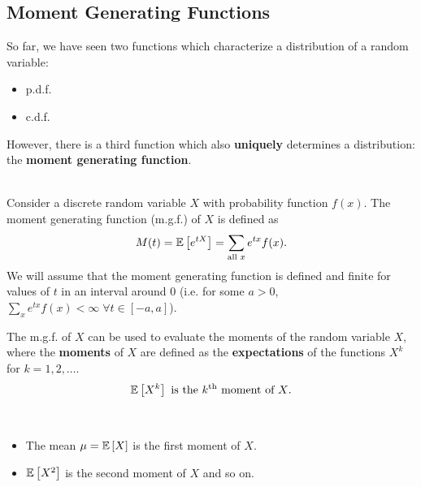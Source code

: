 \pagebreak

\subsection{Moment Generating Functions}

So far, we have seen two functions which characterize a distribution of a random variable:
\begin{itemize}
    \item p.d.f.
    \item c.d.f.
\end{itemize}
However, there is a third function which also \textbf{uniquely} determines a distribution: the \textbf{moment generating function}.


\begin{definition}
    \phantom{}\\
    Consider a discrete random variable $X$ with probability function $f(x)$. The moment generating function (m.g.f.) of $X$ is defined as \vspace{-3mm}
    \[
        M(t) = \mathbb{E}\left[{e^{tX}}\right] = \displaystyle \sum_{\text{all $x$}} e^{tx} f(x).
    \]
    We will assume that the moment generating function is defined and finite for values of $t$ in an interval around 0 (i.e. for some $a > 0$, $\displaystyle \sum_{x} e^{tx} f(x) < \infty \; \forall t \in [-a,a]$).
\end{definition}

The m.g.f. of $X$ can be used to evaluate the moments of the random variable $X$, where the \textbf{moments} of $X$ are defined as the \textbf{expectations} of the functions $X^k$ for $k = 1,2,\ldots$. \vspace{-3mm}
\[
    \mathbb{E}\left[{X^k}\right] \text{ is the $k^{\text{th}}$ moment of $X$.}
\]

\vspace{-3mm}

\begin{example}
    \phantom{}\
    \begin{itemize}
        \item The mean $\mu = \mathbb{E}\left[{X}\right]$ is the first moment of $X$.
        \item $\mathbb{E}\left[{X^2}\right]$ is the second moment of $X$ and so on.
    \end{itemize}
\end{example}

\vspace{2mm}

